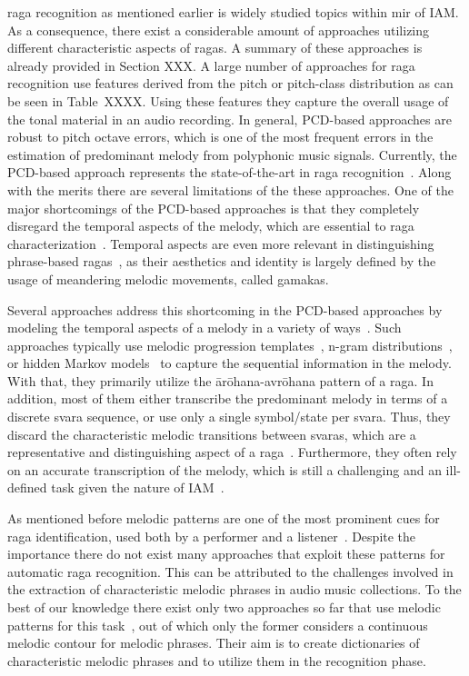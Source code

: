 \Gls{raga} recognition as mentioned earlier is widely studied topics within \gls{mir} of IAM. As a consequence, there exist a considerable amount of approaches utilizing different characteristic aspects of \glspl{raga}. A summary of these approaches is already provided in Section XXX. A large number of approaches for \gls{raga} recognition use features derived from the pitch or pitch-class distribution as can be seen in Table~XXXX. Using these features they capture the overall usage of the tonal material in an audio recording. In general, PCD-based approaches are robust to pitch octave errors, which is one of the most frequent errors in the estimation of predominant melody from polyphonic music signals. Currently, the PCD-based approach represents the state-of-the-art in \gls{raga} recognition~\citep{chordia2013joint}. Along with the merits there are several limitations of the these approaches. One of the major shortcomings of the PCD-based approaches is that they completely disregard the temporal aspects of the melody, which are essential to \gls{raga} characterization~\cite{rao1999raga}. Temporal aspects are even more relevant in distinguishing phrase-based \glspl{raga}~\cite{krishna2012carnatic}, as their aesthetics and identity is largely defined by the usage of meandering melodic movements, called gamakas. 

Several approaches address this shortcoming in the PCD-based approaches by modeling the temporal aspects of a melody in a variety of ways~\cite{kumar2014identifying, shetty2009raga, rajkumar2011identification}. Such approaches typically use melodic progression templates~\cite{shetty2009raga}, n-gram distributions~\cite{kumar2014identifying}, or hidden Markov models~\cite{rajkumar2011identification} to capture the sequential information in the melody. With that, they primarily utilize the \={a}r\={o}hana-avr\={o}hana pattern of a \gls{raga}. In addition, most of them either transcribe the predominant melody in terms of a discrete svara sequence, or use only a single symbol/state per svara. Thus, they discard the characteristic melodic transitions between svaras, which are a representative and distinguishing aspect of a \gls{raga}~\cite{rao1999raga}. Furthermore, they often rely on an accurate transcription of the melody, which is still a challenging and an ill-defined task given the nature of IAM~\cite{rao2012culture, Suvarnalata2014}. 

As mentioned before melodic patterns are one of the most prominent cues for \gls{raga} identification, used both by a performer and a listener~\citep{rao1999raga}. Despite the importance there do not exist many approaches that exploit these patterns for automatic \gls{raga} recognition. This can be attributed to the challenges involved in the extraction of characteristic melodic phrases in audio music collections. To the best of our knowledge there exist only two approaches so far that use melodic patterns for this task~\cite{shrey_ISMIR_2015, sridhar2009raga}, out of which only the former considers a continuous melodic contour for melodic phrases. Their aim is to create dictionaries of characteristic melodic phrases and to utilize them in the recognition phase. 

